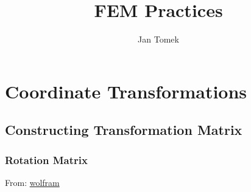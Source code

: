 \documentclass[10pt,b5paper,titlepage]{book}
\author{Jan Tomek}
\title{\bf FEM Practices}
\begin{document}
\maketitle

\tableofcontents


\newpage
\chapter{Coordinate Transformations}

\section{Constructing Transformation Matrix}

\subsection{Rotation Matrix}

From: \href{https://mathworld.wolfram.com/RotationMatrix.html}{wolfram}\\
\end{document}
